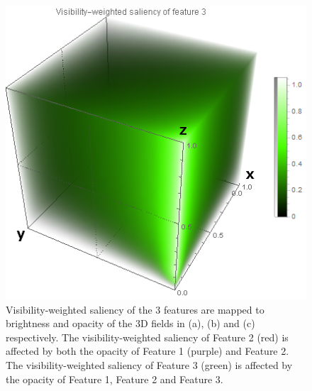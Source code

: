 \begin{figure}
\begin{minipage}{.3\textwidth}
		\subcaption{}
	\end{minipage}
	\begin{minipage}{.3\textwidth}
		\includegraphics[width=1\linewidth]{images/nucleon_strong_red_densityplot3}
		\subcaption{}
	\end{minipage}
	\caption[Visibility-weighted saliency of the 3 features are mapped to brightness and opacity respectively.]{Visibility-weighted saliency of the 3 features are mapped to brightness and opacity of the 3D fields in (a), (b) and (c) respectively. The visibility-weighted saliency of Feature 2 (red) is affected by both the opacity of Feature 1 (purple) and Feature 2. The visibility-weighted saliency of Feature 3 (green) is affected by the opacity of Feature 1, Feature 2 and Feature 3.}
	\label{fig:nucleon_densityplot}
\end{figure}

